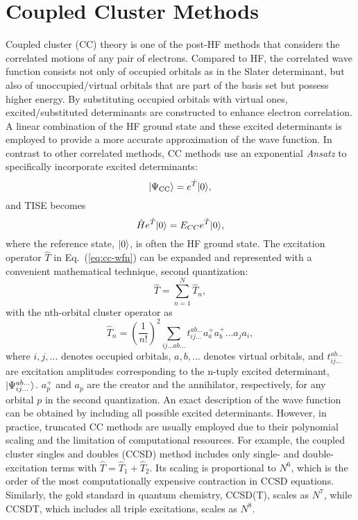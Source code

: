 \section{Coupled Cluster Methods}\label{cc}
Coupled cluster (CC) theory\cite{Crawford2000} is one of the post-HF methods that considers the correlated motions of any pair of electrons. Compared to HF, the correlated wave function consists not only of occupied orbitals as in the Slater determinant, but also of unoccupied/virtual orbitals that are part of the basis set but possess higher energy. By substituting occupied orbitals with virtual ones, excited/substituted determinants are constructed to enhance electron correlation. A linear combination of the HF ground state and these excited determinants is employed to provide a more accurate approximation of the wave function. In contrast to other correlated methods, CC methods use an exponential \textit{Ansatz} to specifically incorporate excited determinants:
\begin{equation}
| \Psi_{\rm CC} \rangle = e^{\hat{T}} | 0 \rangle,
\label{eq:cc-wfn}
\end{equation}
and TISE becomes
\begin{equation}
\hat{H}e^{\hat{T}} | 0 \rangle = E_{CC}e^{\hat{T}} | 0 \rangle,
\end{equation}
where the reference state, $| 0 \rangle$, is often the HF ground state. The excitation operator $\hat{T}$ in Eq.~(\ref{eq:cc-wfn}) can be expanded and represented with a convenient mathematical technique, second quantization:\cite{Dirac1927}   
\begin{equation}
\hat{T} = \sum_{n=1}^{N}\hat{T}_{n},
\end{equation}
with the nth-orbital cluster operator as
\begin{equation}
\hat{T}_{n} = (\frac{1}{n!})^{2}\sum_{ij...ab...}t_{ij...}^{ab...}a_{a}^{+}a_{b}^{+}...a_{j}a_{i},
\end{equation}
where $i, j, ...$ denotes occupied orbitals, $a, b, ...$ denotes virtual orbitals, and $t_{ij...}^{ab...}$ are excitation amplitudes corresponding to the n-tuply excited determinant, $| \Psi_{ij...}^{ab...} \rangle$. $a_{p}^{+}$ and $a_{p}$ are the creator and the annihilator, respectively, for any orbital $p$ in the second quantization. An exact description of the wave function can be obtained by including all possible excited determinants. However, in practice, truncated CC methods are usually employed due to their polynomial scaling and the limitation of computational resources. For example, the coupled cluster singles and doubles (CCSD) method includes only single- and double-excitation terms with $\hat{T}=\hat{T}_{1}+\hat{T}_{2}$. Its scaling is proportional to $N^{6}$, which is the order of the most computationally expensive contraction in CCSD equations. Similarly, the gold standard in quantum chemistry, CCSD(T),\cite{Raghavachari1989} scales as $N^{7}$, while CCSDT,\cite{Noga1987} which includes all triple excitations, scales as $N^{8}$.

